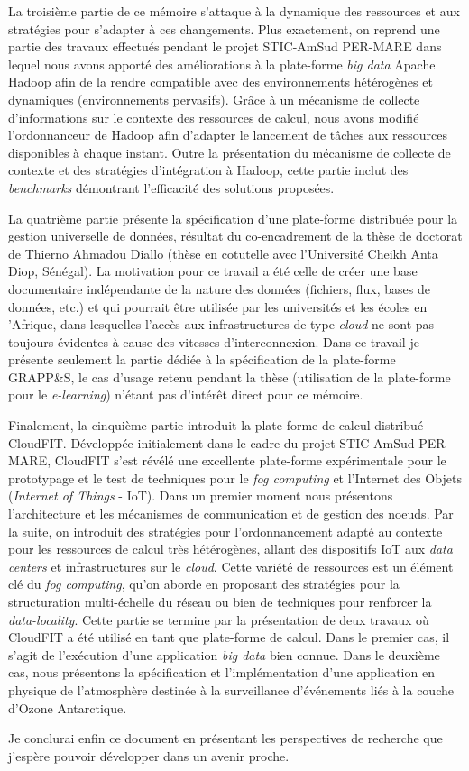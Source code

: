 La troisième partie de ce mémoire s'attaque à la dynamique des ressources et aux stratégies pour s'adapter à ces changements. Plus exactement, on reprend une partie des travaux effectués pendant le projet STIC-AmSud PER-MARE dans lequel nous avons apporté des améliorations à la plate-forme \textit{big data} Apache Hadoop afin de la rendre compatible avec des environnements hétérogènes et dynamiques (environnements pervasifs). Grâce à un mécanisme de collecte d'informations sur le contexte des ressources de calcul, nous avons modifié l'ordonnanceur de Hadoop afin d'adapter le lancement de tâches aux ressources disponibles à chaque instant. Outre la présentation du mécanisme de collecte de contexte et des stratégies d'intégration à Hadoop, cette partie inclut des \textit{benchmarks} démontrant l'efficacité des solutions proposées. 

La quatrième partie présente la spécification d'une plate-forme distribuée pour la gestion universelle de données, résultat du co-encadrement de la thèse de doctorat de Thierno Ahmadou Diallo (thèse en cotutelle avec l'Université Cheikh Anta Diop, Sénégal). La motivation pour ce travail a été celle de créer une base documentaire indépendante de la nature des données (fichiers, flux, bases de données, etc.) et qui pourrait être utilisée par les universités et les écoles en 'Afrique, dans lesquelles l'accès aux infrastructures de type \textit{cloud} ne sont pas toujours évidentes à cause des vitesses d'interconnexion. Dans ce travail je présente seulement la partie dédiée à la spécification de la plate-forme GRAPP\&S, le cas d'usage retenu pendant la thèse (utilisation de la plate-forme pour le \textit{e-learning}) n'étant pas d'intérêt direct pour ce mémoire. 

Finalement, la cinquième partie introduit la plate-forme de calcul distribué CloudFIT. Développée initialement dans le cadre du projet STIC-AmSud PER-MARE, CloudFIT s'est révélé une excellente plate-forme expérimentale pour le prototypage et le test de techniques pour le \textit{fog computing} et l'Internet des Objets (\textit{Internet of Things} - IoT). Dans un premier moment nous présentons l'architecture et les mécanismes de communication et de gestion des n{oe}uds. Par la suite, on introduit des stratégies pour l'ordonnancement adapté au contexte pour les ressources de calcul très hétérogènes, allant des dispositifs IoT aux \textit{data centers} et infrastructures sur le \textit{cloud}. Cette variété de ressources est un élément clé du \textit{fog computing}, qu'on aborde en proposant des stratégies pour la structuration multi-échelle du réseau ou bien de techniques pour renforcer la \textit{data-locality}. Cette partie se termine par la présentation de deux travaux où CloudFIT a été utilisé en tant que plate-forme de calcul. Dans le premier cas, il s'agit de l'exécution d'une application \textit{big data} bien connue. Dans le deuxième cas, nous présentons la spécification et l'implémentation d'une application en physique de l'atmosphère destinée à la surveillance d'événements liés à la couche d'Ozone Antarctique. 

Je conclurai enfin ce document en présentant les perspectives de recherche que j'espère pouvoir développer dans un avenir proche.


 

